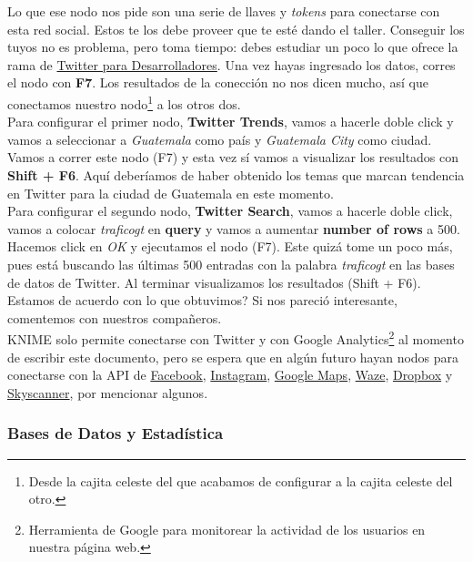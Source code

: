 \documentclass[10pt,letterpaper]{article}
\begin{document}
Lo que ese nodo nos pide son una serie de llaves y \emph{tokens} para conectarse con esta red social. Estos te los debe proveer que te est\'e dando el taller. Conseguir los tuyos no es problema, pero toma tiempo: debes estudiar un poco lo que ofrece la rama de \href{https://dev.twitter.com/}{Twitter para Desarrolladores}. Una vez hayas ingresado los datos, corres el nodo con \textbf{F7}. Los resultados de la conecci\'on no nos dicen mucho, as\'i que conectamos nuestro nodo\footnote{Desde la cajita celeste del que acabamos de configurar a la cajita celeste del otro.} a los otros dos.\\

Para configurar el primer nodo, \textbf{Twitter Trends}, vamos a hacerle doble click y vamos a seleccionar a \emph{Guatemala} como pa\'is y \emph{Guatemala City} como ciudad. Vamos a correr este nodo (F7) y esta vez s\'i vamos a visualizar los resultados con \textbf{Shift + F6}. Aqu\'i deber\'iamos de haber obtenido los temas que marcan tendencia en Twitter para la ciudad de Guatemala en este momento.\\

Para configurar el segundo nodo, \textbf{Twitter Search}, vamos a hacerle doble click, vamos a colocar \emph{traficogt} en \textbf{query} y vamos a aumentar \textbf{number of rows} a 500. Hacemos click en \emph{OK} y ejecutamos el nodo (F7). Este quiz\'a tome un poco m\'as, pues est\'a buscando las \'ultimas 500 entradas con la palabra \emph{traficogt} en las bases de datos de Twitter. Al terminar visualizamos los resultados (Shift + F6). Estamos de acuerdo con lo que obtuvimos? Si nos pareci\'o interesante, comentemos con nuestros compa\~neros.\\

KNIME solo permite conectarse con Twitter y con Google Analytics\footnote{Herramienta de Google para monitorear la actividad de los usuarios en nuestra p\'agina web.} al momento de escribir este documento, pero se espera que en alg\'un futuro hayan nodos para conectarse con la API de \href{https://developers.facebook.com/}{Facebook}, \href{https://www.instagram.com/developer/}{Instagram}, \href{https://developers.google.com/maps/}{Google Maps}, \href{https://www.waze.com/about/dev}{Waze}, \href{https://www.dropbox.com/developers}{Dropbox} y \href{https://partners.skyscanner.net/travel-apis/}{Skyscanner}, por mencionar algunos.

\subsubsection{Bases de Datos y Estad\'istica}
\end{document}
